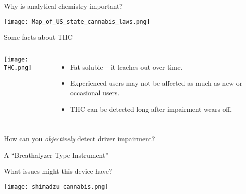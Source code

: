 \documentclass[notes=only]{beamer}
\begin{document}
\begin{frame}{Why is analytical chemistry important?}
	\begin{center}
		\texttt{[image: Map\_of\_US\_state\_cannabis\_laws.png]}
	\end{center}
\end{frame}

\begin{frame}{Some facts about THC}
	\begin{columns}
	\begin{center}
		\texttt{[image: THC.png]}
	\end{center}

	\begin{itemize}
		\item Fat soluble -- it leaches out over time.
		\item Experienced users may not be affected as much as new or
			occasional users.
		\item THC can be detected long after impairment wears off.
	\end{itemize}
	\end{columns}

	\pause

	\begin{center}
		How can you \emph{objectively} detect driver impairment?
	\end{center}

\end{frame}

\begin{frame}{A ``Breathalyzer-Type Instrument''}
	\centering


	\pause
	

	\pause

	What issues might this device have?

\end{frame}

\begin{frame}
	\texttt{[image: shimadzu-cannabis.png]}

\end{frame}
\end{document}
